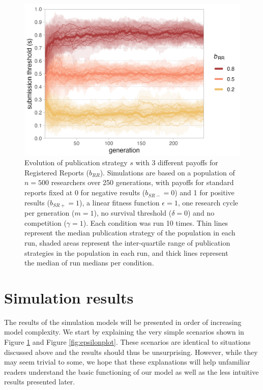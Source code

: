 \documentclass[
  ,man,mask,floatsintext]{apa6}
\begin{document}
\begin{figure}

{\centering \includegraphics[width=5.04in]{plots/plot_evo} 

}

\caption{Evolution of publication strategy \(s\) with 3 different payoffs for Registered Reports (\(b_{RR}\)). Simulations are based on a population of \(n = 500\) researchers over 250 generations, with payoffs for standard reports fixed at 0 for negative results (\(b_{SR-} = 0\)) and 1 for positive results (\(b_{SR+} = 1\)), a linear fitness function \(\epsilon = 1\), one research cycle per generation (\(m = 1\)), no survival threshold (\(\delta = 0\)) and no competition (\(\gamma = 1\)). Each condition was run 10 times. Thin lines represent the median publication strategy of the population in each run, shaded areas represent the inter-quartile range of publication strategies in the population in each run, and thick lines represent the median of run medians per condition.}\label{fig:evoplot}
\end{figure}

\hypertarget{simulation-results}{%
\section{Simulation results}\label{simulation-results}}

The results of the simulation models will be presented in order of increasing model complexity.
We start by explaining the very simple scenarios shown in Figure \ref{fig:evoplot} and Figure \ref{fig:epsilonplot}.
These scenarios are identical to situations discussed above and the results should thus be unsurprising.
However, while they may seem trivial to some, we hope that these explanations will help unfamiliar readers understand the basic functioning of our model as well as the less intuitive results presented later.
\end{document}
